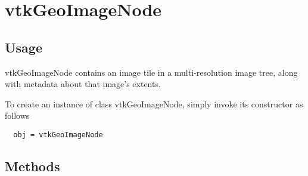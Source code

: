 \section{vtkGeoImageNode}

\subsection{Usage}

 vtkGeoImageNode contains an image tile in a multi-resolution image tree,
 along with metadata about that image's extents.


To create an instance of class vtkGeoImageNode, simply
invoke its constructor as follows
\begin{verbatim}
  obj = vtkGeoImageNode
\end{verbatim}
\subsection{Methods}

